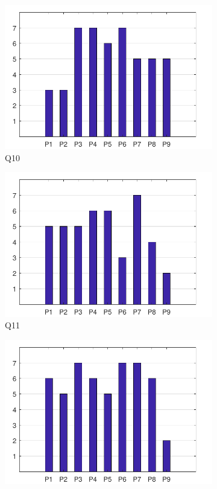 \documentclass[english, 12pt, a4paper, pdftex, elec, utf8]{aaltothesis}
\begin{document}
\begin{figure}[h!]
    \centering
    \begin{subfigure}[b]{0.49\textwidth}
        \includegraphics[width=\textwidth]{T2_1.pdf}
        \caption*{Q10}
    \end{subfigure}
    \begin{subfigure}[b]{0.49\textwidth}
        \includegraphics[width=\textwidth]{T2_2.pdf}
        \caption*{Q11}
    \end{subfigure}
    \begin{subfigure}[b]{0.49\textwidth}
        \includegraphics[width=\textwidth]{T2_3.pdf}

\end{subfigure}
\end{figure}
\end{document}
